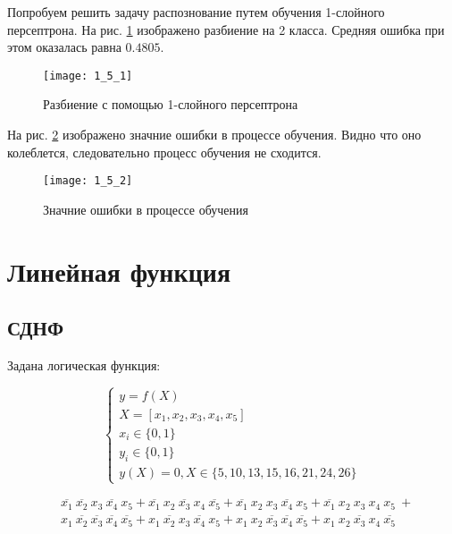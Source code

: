 
Попробуем решить задачу распознование путем обучения 1-слойного персептрона. На рис. \ref{fig:1_5_1} изображено разбиение на 2 класса. Средняя ошибка при этом оказалась равна $0.4805$.

\begin{figure}[H]
\begin{center}
	\texttt{[image: 1\_5\_1]}
	\caption{Разбиение с помощью 1-слойного персептрона}
	\label{fig:1_5_1}
\end{center}
\end{figure}

На рис. \ref{fig:1_5_2} изображено значние ошибки в процессе обучения. Видно что оно колеблется, следовательно процесс обучения не сходится.

\begin{figure}[H]
\begin{center}
	\texttt{[image: 1\_5\_2]}
	\caption{Значние ошибки в процессе обучения}
	\label{fig:1_5_2}
\end{center}
\end{figure}

\section{Линейная функция}

\subsection{СДНФ}

Задана логическая функция:

\begin{equation*}
\begin{cases}
	y = f(X)\\
	X = [x_1, x_2, x_3, x_4, x_5]\\
	x_i \in \{0, 1\}\\
	y_i \in \{0, 1\}\\
	y(X) = 0, X \in \{ 5, 10, 13, 15, 16, 21, 24, 26 \}
\end{cases}
\end{equation*}

\begin{align*}
&\overline{x_1}\ \overline{x_2}\ x_3\ \overline{x_4}\ x_5 +
\overline{x_1}\ x_2\ \overline{x_3}\ x_4\ \overline{x_5} +
\overline{x_1}\ x_2\ x_3\ \overline{x_4}\ x_5 +
\overline{x_1}\ x_2\ x_3\ x_4\ x_5\ + \\
&x_1\ \overline{x_2}\ \overline{x_3}\ \overline{x_4}\ \overline{x_5} +
x_1\ \overline{x_2}\ x_3\ \overline{x_4}\ x_5 +
x_1\ x_2\ \overline{x_3}\ \overline{x_4}\ \overline{x_5} +
x_1\ x_2\ \overline{x_3}\ x_4\ \overline{x_5}
\end{align*}

